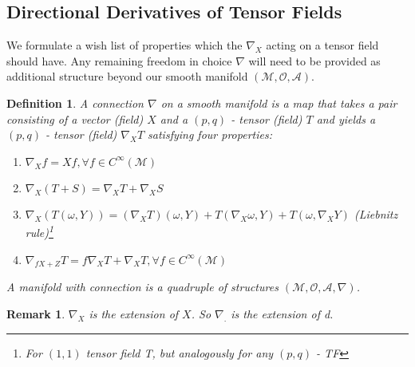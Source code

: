 \documentclass[10pt, oneside]{article}
\newcommand{\M}{\mathcal{M}}
\newtheorem{defn}{Definition}
\newtheorem{remark}{Remark}
\begin{document}
 \subsection{Directional Derivatives of Tensor Fields}
  We formulate a wish list of properties which the $\nabla_X$ acting on a tensor field should have. Any remaining freedom in choice $\nabla$ will need to be provided as additional structure beyond our smooth manifold $(\M, \mathcal{O}, \mathcal{A})$.
 \begin{defn}
  A connection $\nabla$ on a smooth manifold is a map that takes a pair consisting of a vector (field) $X$ and a $(p,q)$ - tensor (field) $T$ and yields a $(p,q)$ - tensor (field) $\nabla_X T$ satisfying four properties:
  \begin{enumerate}
     \item $\nabla_X f = X f, \forall f \in C^\infty (\M)$
     \item $\nabla_X (T + S) = \nabla_X T + \nabla_X S$
     \item $\nabla_X(T(\omega,Y))= (\nabla_X T)(\omega, Y)+T(\nabla_X \omega,Y)+T(\omega,\nabla_X Y)$ (Liebnitz rule)\footnote{For $(1,1)$ tensor field T, but analogously for any $(p,q)$ - TF}
     \item $\nabla_{f X +Z} T = f \nabla_X T +\nabla_X T, \forall f \in C^\infty (\M)$
  \end{enumerate}
  A manifold with connection is a quadruple of structures $(\M, \mathcal{O},\mathcal{A}, \nabla)$.
  \end{defn}
  \begin{remark}
     $\nabla_X$ is the extension of $X$. So $\nabla_.$ is the extension of d.
  \end{remark}
\end{document}
